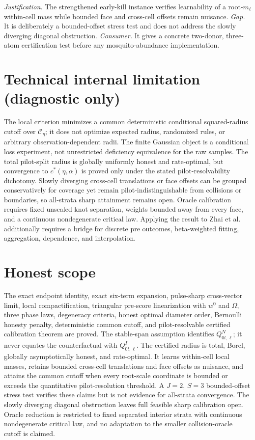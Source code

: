 \documentclass{article}
\begin{document}
\par\smallskip\noindent \textit{Justification.} The strengthened early-kill instance verifies learnability of a root-\(m_\ell\) within-cell mass while bounded face and cross-cell offsets remain nuisance. \textit{Gap.} It is deliberately a bounded-offset stress test and does not address the slowly diverging diagonal obstruction. \textit{Consumer.} It gives a concrete two-donor, three-atom certification test before any mosquito-abundance implementation.

\section*{Technical internal limitation (diagnostic only)}

The local criterion minimizes a common deterministic conditional squared-radius cutoff over \(\mathscr C_\eta\); it does not optimize expected radius, randomized rules, or arbitrary observation-dependent radii.  The finite Gaussian object is a conditional loss experiment, not unrestricted deficiency equivalence for the raw samples.  The total pilot-split radius is globally uniformly honest and rate-optimal, but convergence to \(c^*(\eta,\alpha)\) is proved only under the stated pilot-resolvability dichotomy.  Slowly diverging cross-cell translations or face offsets can be grouped conservatively for coverage yet remain pilot-indistinguishable from collisions or boundaries, so all-strata sharp attainment remains open.  Oracle calibration requires fixed unscaled knot separation, weights bounded away from every face, and a continuous nondegenerate critical law.  Applying the result to Zhai et al. additionally requires a bridge for discrete pre outcomes, beta-weighted fitting, aggregation, dependence, and interpolation.

\section{Honest scope}

The exact endpoint identity, exact six-term expansion, pulse-sharp cross-vector limit, local compactification, triangular pre-score linearization with \(w^0\) and \(\Omega\), three phase laws, degeneracy criteria, honest optimal diameter order, Bernoulli honesty penalty, deterministic common cutoff, and pilot-resolvable certified calibration theorem are proved.  The stable-span assumption identifies \(Q^N_{0t,\ell}\); it never equates the counterfactual with \(Q^I_{0t,\ell}\).  The certified radius is total, Borel, globally asymptotically honest, and rate-optimal.  It learns within-cell local masses, retains bounded cross-cell translations and face offsets as nuisance, and attains the common cutoff when every root-scale coordinate is bounded or exceeds the quantitative pilot-resolution threshold.  A \(J=2\), \(S=3\) bounded-offset stress test verifies these claims but is not evidence for all-strata convergence.  The slowly diverging diagonal obstruction leaves full feasible sharp calibration open.  Oracle reduction is restricted to fixed separated interior strata with continuous nondegenerate critical law, and no adaptation to the smaller collision-oracle cutoff is claimed.
\end{document}
